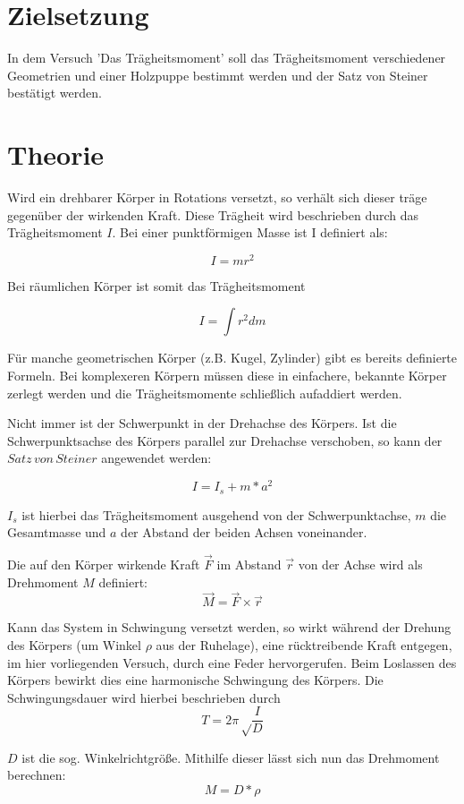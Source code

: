 \documentclass{scrartcl}
\begin{document}
\section{Zielsetzung}
In dem Versuch ’Das Trägheitsmoment’ soll das Trägheitsmoment verschiedener Geometrien und einer Holzpuppe bestimmt werden und der Satz von Steiner bestätigt werden.

\section{Theorie}
Wird ein drehbarer Körper in Rotations versetzt, so verhält sich dieser träge gegenüber der wirkenden Kraft. Diese Trägheit wird beschrieben durch das Trägheitsmoment $I$. Bei einer punktförmigen Masse ist I definiert als:

\begin{equation}
	I = mr^2
\end{equation}

Bei räumlichen Körper ist somit das Trägheitsmoment

\begin{equation}
	I = \int r^2 dm
\end{equation}

Für manche geometrischen Körper (z.B. Kugel, Zylinder) gibt es bereits definierte Formeln. Bei komplexeren Körpern müssen diese in einfachere, bekannte Körper zerlegt werden und die Trägheitsmomente schließlich aufaddiert werden.

Nicht immer ist der Schwerpunkt in der Drehachse des Körpers. Ist die Schwerpunktsachse des Körpers parallel zur Drehachse verschoben, so kann der $Satz \, von \, Steiner$ angewendet werden:

\begin{equation}
	I = I_s+m*a^2
\end{equation}

$I_s$ ist hierbei das Trägheitsmoment ausgehend von der Schwerpunktachse, $m$ die Gesamtmasse und $a$ der Abstand der beiden Achsen voneinander.

Die auf den Körper wirkende Kraft $\vec{F}$ im Abstand $\vec{r}$ von der Achse wird als Drehmoment $M$ definiert:
\begin{equation}
	\vec{M} = \vec{F} \times \vec{r}
\end{equation}

Kann das System in Schwingung versetzt werden, so wirkt während der Drehung des Körpers (um Winkel $\rho$ aus der Ruhelage), eine rücktreibende Kraft entgegen, im hier vorliegenden Versuch, durch eine Feder hervorgerufen.
Beim Loslassen des Körpers bewirkt dies eine harmonische Schwingung des Körpers. Die Schwingungsdauer wird hierbei beschrieben durch
\begin{equation}
	T = 2\pi\sqrt\frac{I}{D}
\end{equation}

$D$ ist die sog. Winkelrichtgröße. Mithilfe dieser lässt sich nun das Drehmoment berechnen:
\begin{equation}
	M = D*\rho
\end{equation}
\end{document}
